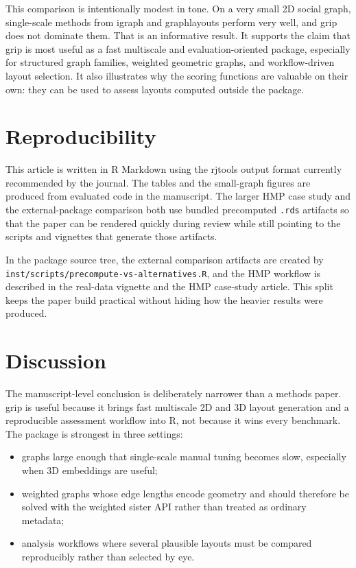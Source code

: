 This comparison is intentionally modest in tone. On a very small 2D social
graph, single-scale methods from igraph and graphlayouts perform very well, and
grip does not dominate them. That is an informative result. It supports the
claim that grip is most useful as a fast multiscale and evaluation-oriented
package,
especially for structured graph families, weighted geometric graphs, and
workflow-driven layout selection. It also illustrates why the scoring
functions are valuable on their own: they can be used to assess layouts
computed outside the package.

\section{Reproducibility}\label{reproducibility}

This article is written in R Markdown using the rjtools output format currently
recommended by the journal. The tables and the small-graph figures are produced
from evaluated code in the manuscript. The larger HMP case study and the
external-package comparison both use bundled precomputed \texttt{.rds} artifacts so
that the paper can be rendered quickly during review while still pointing to
the scripts and vignettes that generate those artifacts.

In the package source tree, the external comparison artifacts are created by
\texttt{inst/scripts/precompute-vs-alternatives.R}, and the HMP workflow is described
in the real-data vignette and the HMP case-study article. This split keeps the
paper build practical without hiding how the heavier results were produced.

\section{Discussion}\label{discussion}

The manuscript-level conclusion is deliberately narrower than a methods paper.
grip is useful because it brings fast multiscale 2D and 3D layout generation
and a reproducible assessment workflow into R, not because it wins every
benchmark. The package is strongest in three settings:

\begin{itemize}
\tightlist
\item
  graphs large enough that single-scale manual tuning becomes slow, especially
  when 3D embeddings are useful;
\item
  weighted graphs whose edge lengths encode geometry and should therefore be
  solved with the weighted sister API rather than treated as ordinary metadata;
\item
  analysis workflows where several plausible layouts must be compared
  reproducibly rather than selected by eye.
\end{itemize}

